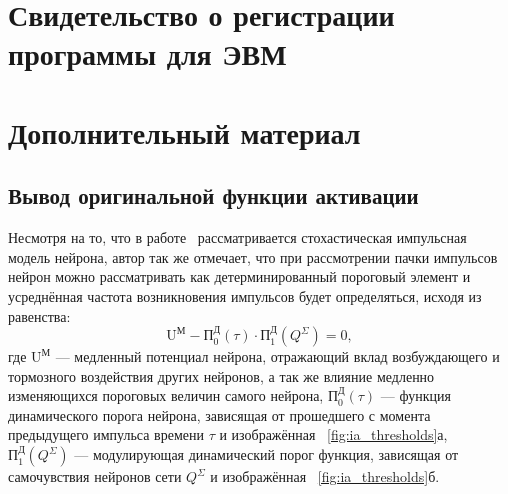 \appendix
\setlength{\midchapskip}{20pt}
\renewcommand*{\afterchapternum}{\par\nobreak\vskip \midchapskip}
\renewcommand\thechapter{\Asbuk{chapter}} %


\chapter{Свидетельство о регистрации программы для ЭВМ} \label{appendix:programm_registration}
\begin{figure}[ht]
\end{figure}


\chapter{Дополнительный материал} \label{appendix:math}

\section{Вывод оригинальной функции активации}  \label{appendix:math:activation_function}

Несмотря на то, что в работе~\cite{EmelyanovYaroslavsky1990} рассматривается стохастическая импульсная модель нейрона, автор так же отмечает, что при рассмотрении \socalled пачки импульсов нейрон можно рассматривать как детерминированный пороговый элемент и усреднённая частота возникновения импульсов будет определяться, исходя из равенства: $$\text{U}^\text{М} - \text{П}_{0}^\text{Д}(\tau) \cdot \text{П}_{1}^\text{Д}(Q^\Sigma) = 0 ,$$ где $\text{U}^\text{М}$ --- медленный потенциал нейрона, отражающий вклад возбуждающего и тормозного воздействия других нейронов, а так же влияние медленно изменяющихся пороговых величин самого нейрона, $\text{П}_{0}^\text{Д}(\tau)$ --- функция динамического порога нейрона, зависящая от прошедшего с момента предыдущего импульса времени $\tau$ и изображённая \onfigure~\ref{fig:ia_thresholds}а, $\text{П}_{1}^\text{Д}(Q^\Sigma)$ --- модулирующая динамический порог функция, зависящая от \socalled самочувствия нейронов сети $Q^\Sigma$ и изображённая \onfigure~\ref{fig:ia_thresholds}б.

